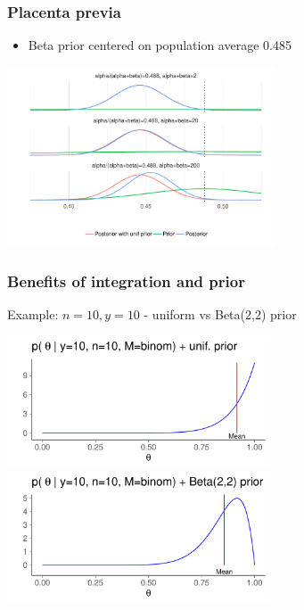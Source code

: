 \documentclass[10pt]{beamer}
\begin{document}
\begin{frame}
  \frametitle{Placenta previa}

  \begin{itemize}
  \item Beta prior centered on population average 0.485
  \end{itemize}
  \includegraphics[width=8cm]{figs/demo2_2.pdf}
\end{frame}

\begin{frame}
  \frametitle{Benefits of integration and prior}

  \vspace{-0.5\baselineskip}
  Example: $n=10, y=10$ - uniform vs Beta(2,2) prior
  \begin{center}
  \includegraphics[width=7.8cm]{figs/dbbeta10a.pdf}\\
  \includegraphics[width=7.8cm]{figs/dbbeta10b.pdf}
  \end{center}

\end{frame}
\end{document}
